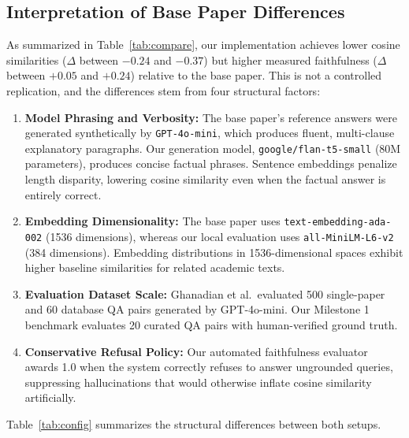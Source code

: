 \documentclass[conference]{IEEEtran}
\begin{document}
\subsection{Interpretation of Base Paper Differences}
As summarized in Table~\ref{tab:compare}, our implementation achieves lower cosine similarities ($\Delta$ between $-0.24$ and $-0.37$) but higher measured faithfulness ($\Delta$ between $+0.05$ and $+0.24$) relative to the base paper. This is not a controlled replication, and the differences stem from four structural factors:
\begin{enumerate}
\item \textbf{Model Phrasing and Verbosity:} The base paper's reference answers were generated synthetically by \texttt{GPT-4o-mini}, which produces fluent, multi-clause explanatory paragraphs. Our generation model, \texttt{google/flan-t5-small} (80M parameters), produces concise factual phrases. Sentence embeddings penalize length disparity, lowering cosine similarity even when the factual answer is entirely correct.
\item \textbf{Embedding Dimensionality:} The base paper uses \texttt{text-embedding-ada-002} (1536 dimensions), whereas our local evaluation uses \texttt{all-MiniLM-L6-v2} (384 dimensions). Embedding distributions in 1536-dimensional spaces exhibit higher baseline similarities for related academic texts.
\item \textbf{Evaluation Dataset Scale:} Ghanadian et al.\ evaluated 500 single-paper and 60 database QA pairs generated by GPT-4o-mini. Our Milestone 1 benchmark evaluates 20 curated QA pairs with human-verified ground truth.
\item \textbf{Conservative Refusal Policy:} Our automated faithfulness evaluator awards 1.0 when the system correctly refuses to answer ungrounded queries, suppressing hallucinations that would otherwise inflate cosine similarity artificially.
\end{enumerate}

Table~\ref{tab:config} summarizes the structural differences between both setups.
\end{document}
